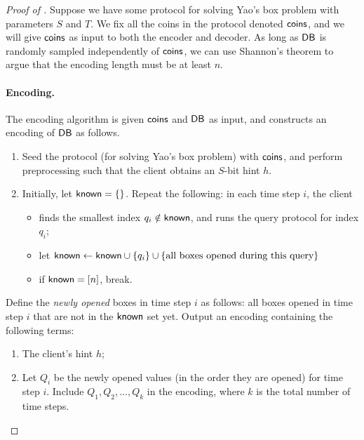 \begin{proof}[Proof of ]
Suppose we have some protocol for solving Yao's box problem 
with parameters $S$ and $T$. 
We fix all the coins in the protocol denoted ${\sf coins}$,
and we will give ${\sf coins}$ as input to 
both the encoder and decoder. 
As long as ${\sf DB}$ is randomly sampled independently of ${\sf coins}$,
we can use Shannon's theorem to argue
that the encoding length must be at least $n$.

\paragraph{Encoding.}
The encoding algorithm is given ${\sf coins}$ and ${\sf DB}$ as input,
and constructs an encoding of ${\sf DB}$ as follows.

    \begin{enumerate}[leftmargin=6mm]
        \item Seed the protocol (for solving Yao's box problem) 
with ${\sf coins}$, and 
perform preprocessing
such that the client obtains an $S$-bit hint $h$.
        \item 
Initially, let ${\sf known} = \{\}$. 
Repeat the following: 
in each time step $i$, the client 
\begin{itemize}[leftmargin=5mm]
\item finds the smallest 
index $q_i \notin {\sf known}$, and 
runs the query protocol for index $q_i$; 
\item 
let ${\sf known} \leftarrow {\sf known} 
\cup \{q_i\} \cup \{\text{all boxes opened during this query}\}$
\item if ${\sf known} = [n]$, break. %
\end{itemize}
    \end{enumerate}

Define the {\it newly opened} boxes in 
time step $i$ as follows: 
all boxes opened in time step $i$ that are not in the ${\sf known}$ 
set yet. 
Output an encoding containing the following terms:
\begin{enumerate}[leftmargin=6mm]
\item 
The client's hint $h$;
\item 
Let $Q_i$ be the newly opened values  
(in the order they are opened)
for time step $i$.
Include $Q_1, Q_2, \ldots, Q_k$ 
in the encoding, where $k$ 
is the total number of time steps.
\end{enumerate}


\end{proof}
